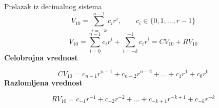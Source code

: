 \begin{frame}[label=04-s007]{Prelazak iz decimalnog sistema}
\setlength{\abovedisplayskip}{3pt}\setlength{\belowdisplayskip}{3pt}
\[V_{10}=\sum_{i=-k}^{n-1}c_i r^i,\qquad c_i\in\{0,1,\ldots,r-1\}\]
\[V_{10}=\textstyle\sum_{i=0}^{n-1}c_i r^i+\sum_{i=-k}^{-1}c_i r^i=CV_{10}+RV_{10}\]
\textbf{Celobrojna vrednost}\par
\[CV_{10}=c_{n-1}r^{n-1}+c_{n-2}r^{n-2}+\ldots+c_1r^1+c_0r^0\]
\textbf{Razlomljena vrednost}\par
\[RV_{10}=c_{-1}r^{-1}+c_{-2}r^{-2}+\ldots+c_{-k+1}r^{-k+1}+c_{-k}r^{-k}\]
\end{frame}
